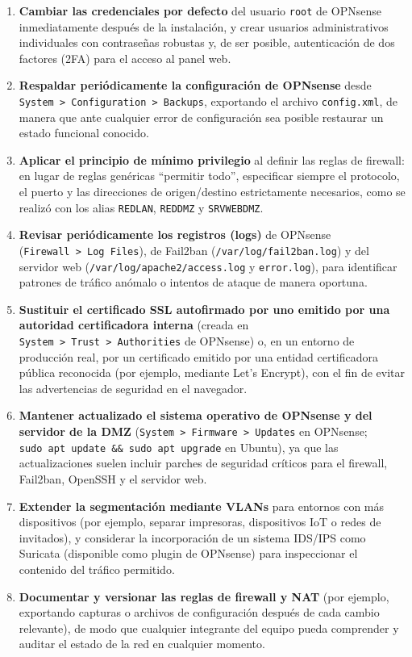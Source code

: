 \documentclass{article}
\renewcommand{\_}{\oldunderscore\hskip0pt\relax}
\begin{document}
\begin{enumerate}
\def\labelenumi{\arabic{enumi}.}
\item
  \textbf{Cambiar las credenciales por defecto} del usuario
  \texttt{root} de OPNsense inmediatamente después de la instalación, y
  crear usuarios administrativos individuales con contraseñas robustas
  y, de ser posible, autenticación de dos factores (2FA) para el acceso
  al panel web.
\item
  \textbf{Respaldar periódicamente la configuración de OPNsense} desde
  \texttt{System\ \textgreater{}\ Configuration\ \textgreater{}\ Backups},
  exportando el archivo \texttt{config.xml}, de manera que ante
  cualquier error de configuración sea posible restaurar un estado
  funcional conocido.
\item
  \textbf{Aplicar el principio de mínimo privilegio} al definir las
  reglas de firewall: en lugar de reglas genéricas ``permitir todo'',
  especificar siempre el protocolo, el puerto y las direcciones de
  origen/destino estrictamente necesarios, como se realizó con los alias
  \texttt{RED\_LAN}, \texttt{RED\_DMZ} y \texttt{SRV\_WEB\_DMZ}.
\item
  \textbf{Revisar periódicamente los registros (logs)} de OPNsense
  (\texttt{Firewall\ \textgreater{}\ Log\ Files}), de Fail2ban
  (\texttt{/var/log/fail2ban.log}) y del servidor web
  (\texttt{/var/log/apache2/access.log} y \texttt{error.log}), para
  identificar patrones de tráfico anómalo o intentos de ataque de manera
  oportuna.
\item
  \textbf{Sustituir el certificado SSL autofirmado por uno emitido por
  una autoridad certificadora interna} (creada en
  \texttt{System\ \textgreater{}\ Trust\ \textgreater{}\ Authorities} de
  OPNsense) o, en un entorno de producción real, por un certificado
  emitido por una entidad certificadora pública reconocida (por ejemplo,
  mediante Let's Encrypt), con el fin de evitar las advertencias de
  seguridad en el navegador.
\item
  \textbf{Mantener actualizado el sistema operativo de OPNsense y del
  servidor de la DMZ}
  (\texttt{System\ \textgreater{}\ Firmware\ \textgreater{}\ Updates} en
  OPNsense; \texttt{sudo\ apt\ update\ \&\&\ sudo\ apt\ upgrade} en
  Ubuntu), ya que las actualizaciones suelen incluir parches de
  seguridad críticos para el firewall, Fail2ban, OpenSSH y el servidor
  web.
\item
  \textbf{Extender la segmentación mediante VLANs} para entornos con más
  dispositivos (por ejemplo, separar impresoras, dispositivos IoT o
  redes de invitados), y considerar la incorporación de un sistema
  IDS/IPS como Suricata (disponible como plugin de OPNsense) para
  inspeccionar el contenido del tráfico permitido.
\item
  \textbf{Documentar y versionar las reglas de firewall y NAT} (por
  ejemplo, exportando capturas o archivos de configuración después de
  cada cambio relevante), de modo que cualquier integrante del equipo
  pueda comprender y auditar el estado de la red en cualquier momento.
\end{enumerate}
\end{document}
